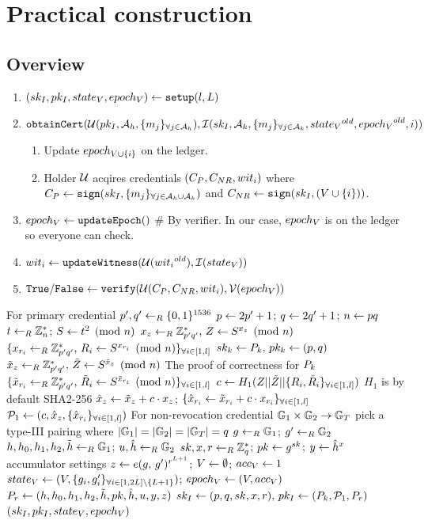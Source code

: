 \documentclass{article}
\begin{document}
\section{Practical construction}
\subsection{Overview}
\begin{enumerate}
	\item $\setupp\la \setupi$
	\item $\mt{obtainCert}(\mc{U}(pk_I, \ah, \group{m_{j}}{j}{\ah }), \mc{I}(\ski, \ak, \group{m_{j}}{j}{\ak }, \old{\stv }, \old{\epv },i))$
	\begin{enumerate}
		\item Update $\ep{\vi } $ on the ledger.
		\item Holder $\mc{U}$ acqires credentials $(C_{P}, C_{NR}, \witi )$ where $C_{P}\la \mt{sign}(\ski, \group{m_{j}}{j}{\ahk })$ and $C_{NR}\la \mt{sign}(\ski, (\vi ))$.
	\end{enumerate}
	\item $\epv \la \mt{updateEpoch}()$ \# By verifier. In our case, $\epv $ is on the ledger so everyone can check.
	\item $\witi \la \mt{updateWitness}(\mc{U}(\old{\witi }), \mc{I}(\stv ))$
	\item $\true /\false \la \mt{verify}(\mc{U}(C_{P}, C_{NR}, \witi ), \mc{V}(\epv))$
\end{enumerate}

\begin{algorithm}
\caption{$\setupi$}
\label{alg:setup}
\begin{algorithmic}
	\State \Comment For primary credential
	\State $p',q'\lar \binbits{1536}$
	\State $p\la 2p'+1$; $q\la 2q'+1$; $n\la pq$
	\State $t\lar \mbz{n}$; $\equivmod{S}{t^2}{n}$
	\State $\randexpm{x_{z}}{p'q'}{Z}{S}{n}$
	\State $\group{\randexpm{x_{r_i}}{p'q'}{R_{i}}{S}{n}}{i}{\rgpl }$
	\State $\keypairv{k}{\pk}{(p,q)}$
	\State $\randexpm{\td{x}_{z}}{p'q'}{\td{Z}}{S}{n}$
	\State \Comment The proof of correctness for $\pk $
	\State $\group{\randexpm{\td{x}_{r_i}}{p'q'}{\td{R}_{i}}{S}{n}}{i}{\rgpl }$
	\State $c\la H_{1}(Z||\td{Z}||\group{R_i,\td{R}_i}{i}{\rgpl })$
	\Comment $H_1$ is by default SHA2-256
	\State $\zkp{x}{z}$; $\group{\zkp{x}{r_{i}}}{i}{\rgpl }$
	\State $\pl \la \plp$
	\State \Comment For non-revocation credential
	\State $\mbg{1}\times \mbg{2} \rightarrow \mbg{T}$
	\Comment pick a type-III pairing where $|\mbg{1}|=|\mbg{2}|=|\mbg{T}|=q$
	\State $g\lar \mbg{1}$; $g'\lar \mbg{2}$
	\State $h, h_0, h_1, h_2, \td{h}\lar \mbg{1}$; $u, \hat{h}\lar \mbg{2}$
	\State $sk, x, r \lar \mbz{q} $; $pk \la g^{sk}$; $y \la \hat{h}^{x}$
	\State \Comment accumulator settings
	\State $z\la \pairingexp{g}{g'}{r^{L + 1}}$; $V\la \emptyset$; $\accv \la 1$
	\State $\stv \la \stp $; $\epv \la \epp $
	\State $\pr \la \prp $
	\State $\keypairv{I}{(p, q, sk, x, r)}{\pkip }$
	\State \Return $\setupp $
\end{algorithmic}
\end{algorithm}
\end{document}
